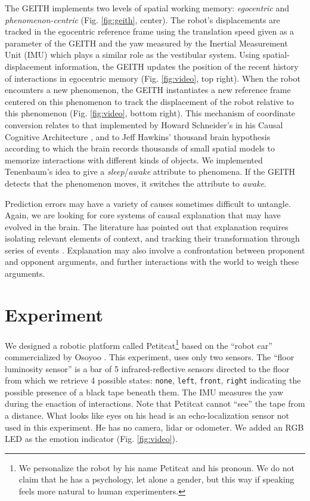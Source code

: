 \documentclass[runningheads]{llncs}
\begin{document}
The GEITH implements two levels of spatial working memory: \textit{egocentric} and \textit{phenomenon-centric} (Fig. \ref{fig:geith}, center).  
The robot's displacements are tracked in the egocentric reference frame using the translation speed given as a parameter of the GEITH and the yaw measured by the Inertial Measurement Unit (IMU) which plays a similar role as the vestibular system. 
Using spatial-displacement information, the GEITH updates the position of the recent history of interactions in egocentric memory (Fig. \ref{fig:video}, top right).
When the robot encounters a new phenomenon, the GEITH instantiates a new reference frame centered on this phenomenon to track the displacement of the robot relative to this phenomenon (Fig. \ref{fig:video}, bottom right). 
This mechanism of coordinate conversion relates to that implemented by Howard Schneider's in his Causal Cognitive Architecture \cite{schneider_enabling_2020}, and to 
Jeff Hawkins' thousand brain hypothesis \cite{hawkins_framework_2019} according to which the brain records thousands of small spatial models to memorize interactions with different kinds of objects.
We implemented Tenenbaum's idea to give a \textit{sleep}/\textit{awake} attribute to phenomena. If the GEITH detects that the phenomenon moves, it switches the attribute to \textit{awake}.

Prediction errors may have a variety of causes sometimes difficult to untangle. 
Again, we are looking for core systems of causal explanation that may have evolved in the brain.
The literature has pointed out that explanation requires isolating relevant elements of context, and tracking their transformation through series of events \cite{thorisson_explanation_2021}. 
Explanation may also involve a confrontation between proponent and opponent arguments, and further interactions with the world to weigh these arguments. 


\section{Experiment}
\label{sec:expe}

We designed a robotic platform called Petitcat\footnote{We personalize the robot by his name Petitcat and his pronoun. We do not claim that he has a psychology, let alone a gender, but this way if speaking feels more natural to human experimenters.} based on the ``robot car'' commercialized by Osoyoo \cite{osoyoo_robot_car}.
This experiment, uses only two sensors.
The ``floor luminosity sensor'' is a bar of 5 infrared-reflective sensors directed to the floor from which we retrieve 4 possible states:  \texttt{none},  \texttt{left},  \texttt{front},  \texttt{right} indicating the possible presence of a black tape beneath them.  
The IMU measures the yaw during the enaction of interactions.
Note that Petitcat cannot ``see'' the tape from a distance. 
What looks like eyes on his head is an echo-localization sensor not used in this experiment. 
He has no camera, lidar or odometer.
We added an RGB LED as the emotion indicator (Fig. \ref{fig:video}). 
\end{document}
